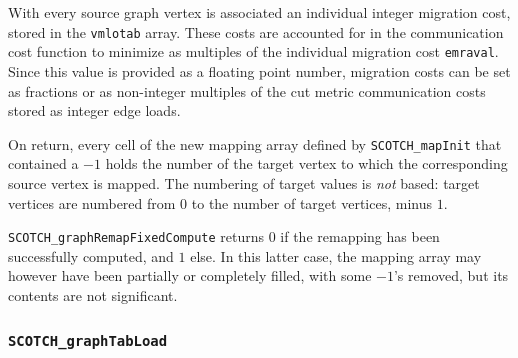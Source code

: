 \begin{itemize}
With every source graph vertex is associated an individual integer
migration cost, stored in the {\tt vmlotab} array. These costs are
accounted for in the communication cost function to minimize as
multiples of the individual migration cost {\tt emraval}. Since this
value is provided as a floating point number, migration costs can be
set as fractions or as non-integer multiples of the cut metric
communication costs stored as integer edge loads.

On return, every cell of the new mapping array defined by
{\tt SCOTCH\_\lbt map\lbt Init} that contained a $-1$ holds the number
of the target vertex to which the corresponding source vertex is
mapped. The numbering of target values is {\em not\/} based: target
vertices are numbered from $0$ to the number of target vertices, minus
$1$.

\progret

{\tt SCOTCH\_graphRemapFixedCompute} returns $0$ if the remapping has
been successfully computed, and $1$ else. In this latter case, the
mapping array may however have been partially or completely filled,
with some $-1$'s removed, but its contents are not significant.
\end{itemize}

\subsubsection{{\tt SCOTCH\_graphTabLoad}}
\label{sec-lib-graph-tab-load}

